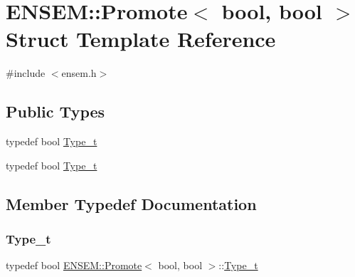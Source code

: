 \hypertarget{structENSEM_1_1Promote_3_01bool_00_01bool_01_4}{}\section{E\+N\+S\+EM\+:\+:Promote$<$ bool, bool $>$ Struct Template Reference}
\label{structENSEM_1_1Promote_3_01bool_00_01bool_01_4}


{\ttfamily \#include $<$ensem.\+h$>$}

\subsection*{Public Types}
\begin{DoxyCompactItemize}
\item 
typedef bool \mbox{\hyperlink{structENSEM_1_1Promote_3_01bool_00_01bool_01_4_a5838c93b09205ae2ab83138d0d4c02e4}{Type\+\_\+t}}
\item 
typedef bool \mbox{\hyperlink{structENSEM_1_1Promote_3_01bool_00_01bool_01_4_a5838c93b09205ae2ab83138d0d4c02e4}{Type\+\_\+t}}
\end{DoxyCompactItemize}


\subsection{Member Typedef Documentation}
\mbox{\label{structENSEM_1_1Promote_3_01bool_00_01bool_01_4_a5838c93b09205ae2ab83138d0d4c02e4}} 
\subsubsection{\texorpdfstring{Type\_t}{Type\_t}\hspace{0.1cm}{\footnotesize\ttfamily [1/2]}}
{\footnotesize\ttfamily typedef bool \mbox{\hyperlink{structENSEM_1_1Promote}{E\+N\+S\+E\+M\+::\+Promote}}$<$ bool, bool $>$\+::\mbox{\hyperlink{structENSEM_1_1Promote_3_01bool_00_01bool_01_4_a5838c93b09205ae2ab83138d0d4c02e4}{Type\+\_\+t}}}

\mbox{\label{structENSEM_1_1Promote_3_01bool_00_01bool_01_4_a5838c93b09205ae2ab83138d0d4c02e4}} 
